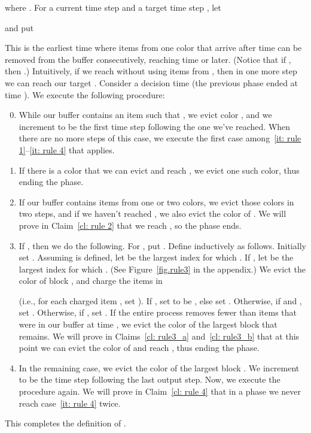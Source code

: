 \documentclass[11pt]{article}
\begin{document}
where .
For a current time step  and a target time step , let

and put

This is the earliest time where items from one color that arrive after
time  can be removed from the buffer consecutively,
reaching time  or later. (Notice that if , then .)
Intuitively, if we reach  without using items from ,
then in one more step we can reach our target .
Consider a decision time  (the previous phase ended at time ).
We execute the following procedure:
\begin{enumerate}
\setcounter{enumi}{-1}
\item\label{it: rule 0} While our buffer contains an item  such that
         , we evict color , and we increment 
         to be the first time step following the one we've reached. When
         there are no more steps of this case, we execute the first case
         among~\ref{it: rule 1}--\ref{it: rule 4} that applies.
\item\label{it: rule 1} If there is a color  that we can evict and
         reach , we evict one such color, thus ending the phase.
\item\label{it: rule 2} If our buffer contains  items from one
         or two colors, we evict those colors in two steps, and if we haven't
         reached , we also evict the color of . We
         will prove in Claim~\ref{cl: rule 2} that we reach , so the phase
         ends.
\item\label{it: rule 3} If ,
         then we do the following. For , put
         . Define
          inductively as follows. Initially
         set . Assuming  is defined, let  be the
         largest index for which
         .
         If ,
         let  be the largest index for which
         .
         (See Figure~\ref{fig.rule3} in the appendix.)
         We evict the color of block , and charge the items in
         
         (i.e., for each charged item , set ). If ,
         set  to be , else set .
         Otherwise, if 
         and , set . 
         Otherwise, if , set .
         If the entire process removes fewer than  
         items that were in our buffer at time ,
         we evict the color of the largest block 
         that remains. We will prove in Claims~\ref{cl: rule3_a} and~\ref{cl: rule3_b}
         that at this point we can evict the color of  and reach , thus
         ending the phase.
\item\label{it: rule 4} In the remaining case,
we evict the color of the largest block .
         We increment 
         to be the time step following the last output step. Now, we
         execute the procedure again. We will prove in Claim~\ref{cl: rule 4}
         that in a phase we never reach case~\ref{it: rule 4} twice.
\end{enumerate}
This completes the definition of .
\end{document}

